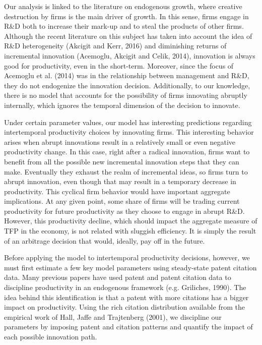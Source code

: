 \documentclass[letterpaper,12pt]{article}
\theoremstyle{definition}
\begin{document}
Our analysis is linked to the literature on endogenous growth, where creative destruction by firms is the main driver of growth. In this sense, firms engage in R\&D both to increase their mark-up and to steal the products of other firms. Although the recent literature on this subject has taken into account the idea of R\&D heterogeneity (Akcigit and Kerr, 2016) and diminishing returns of incremental innovation (Acemoglu, Akcigit and Celik, 2014), innovation is always good for productivity, even in the short-term. Moreover, since the focus of Acemoglu et al. (2014) was in the relationship between management and R\&D, they do not endogenize the innovation decision. Additionally, to our knowledge, there is no model that accounts for the possibility of firms innovating abruptly internally, which ignores the temporal dimension of the decision to innovate.

Under certain parameter values, our model has interesting predictions regarding intertemporal productivity choices by innovating firms. This interesting behavior arises when abrupt innovations result in a relatively small or even negative productivity change. In this case, right after a radical innovation, firms want to benefit from all the possible new incremental innovation steps that they can make. Eventually they exhaust the realm of incremental ideas, so firms turn to abrupt innovation, even though that may result in a temporary decrease in productivity. This cyclical firm behavior would  have important aggregate implications. At any given point, some share of firms will be trading current productivity for future productivity as they choose to engage in abrupt R\&D. However, this productivity decline, which should impact the aggregate measure of TFP in the economy, is not related with sluggish efficiency. It is simply the result of an arbitrage decision that would, ideally, pay off in the future.

Before applying the model to intertemporal productivity decisions, however, we must first estimate a few key model parameters using steady-state patent citation data. Many previous papers have used patent and patent citation data to discipline productivity in an endogenous framework (e.g. Griliches, 1990). The idea behind this identification is that a patent with more citations has a bigger impact on productivity. Using the rich citation distribution available from the empirical work of Hall, Jaffe and Trajtenberg (2001), we discipline our parameters by imposing patent and citation patterns and quantify the impact of each possible innovation path. 
\end{document}
